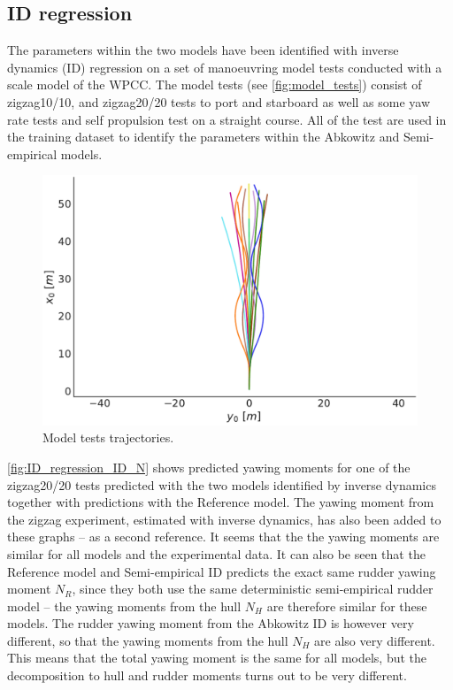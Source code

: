 \subsection{ID regression}
\label{sec:result_ID_regression}
The parameters within the two models have been identified with inverse dynamics (ID) regression on a set of manoeuvring model tests conducted with a scale model of the WPCC. The model tests (see \autoref{fig:model_tests}) consist of zigzag10/10, and zigzag20/20 tests to port and starboard as well as some yaw rate tests and self propulsion test on a straight course. All of the test are used in the training dataset to identify the parameters within the Abkowitz and Semi-empirical models.
\begin{figure}[h!]
    \includegraphics[width=\columnwidth]{figures/result_ID_regression.model_tests.pdf}
    \caption{Model tests trajectories.}
    \label{fig:model_tests}
\end{figure}
\autoref{fig:ID_regression_ID_N} shows predicted yawing moments for one of the zigzag20/20 tests predicted with the two models identified by inverse dynamics together with predictions with the Reference model. The yawing moment from the zigzag experiment, estimated with inverse dynamics, has also been added to these graphs -- as a second reference. It seems that the the yawing moments are similar for all models and the experimental data. It can also be seen that the Reference model and Semi-empirical ID predicts the exact same rudder yawing moment $N_R$, since they both use the same deterministic semi-empirical rudder model -- the yawing moments from the hull $N_H$ are therefore similar for these models. The rudder yawing moment from the Abkowitz ID is however very different, so that the yawing moments from the hull $N_H$ are also very different. This means that the total yawing moment is the same for all models, but the decomposition to hull and rudder moments turns out to be very different.
